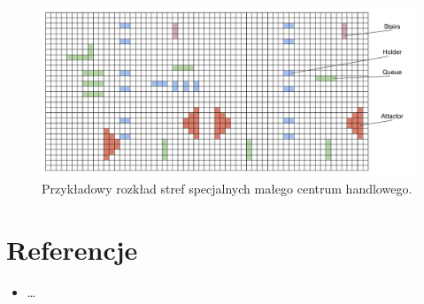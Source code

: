 \documentclass[a4paper, 12pt]{article}
\begin{document}
        \begin{figure}[h!]
            \centering
            \includegraphics[scale=0.2]{./img/MallFeatures.pdf}
            \caption{Przykładowy rozkład stref specjalnych małego centrum handlowego.}
            \label{fig:mall-features}
        \end{figure}



\newpage
    \section{Referencje}
    \label{sec:refs}

    \begin{itemize}
        \begin{item} \label{refs:social-distances-1} Social Distances TODO \end{item}
        \item \ldots
    \end{itemize}
\end{document}
